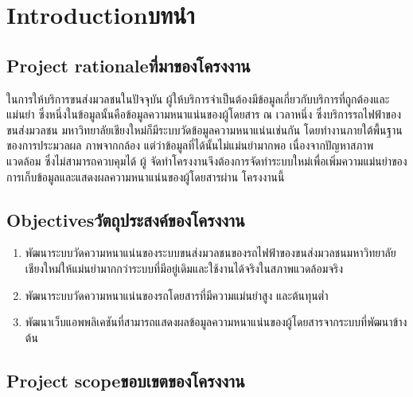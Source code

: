 \chapter{\ifenglish Introduction\else บทนำ\fi}

\section{\ifenglish Project rationale\else ที่มาของโครงงาน\fi}

ในการให้บริการขนส่งมวลชนในปัจจุบัน ผู้ให้บริการจําเป็นต้องมีข้อมูลเกี่ยวกับบริการที่ถูกต้องและแม่นยํา
ซึ่งหนึ่งในข้อมูลนั้นคือข้อมูลความหนาแน่นของผู้โดยสาร ณ เวลาหนึ่ง ซึ่งบริการรถไฟฟ้าของขนส่งมวลชน
มหาวิทยาลัยเชียงใหม่ก็มีระบบวัดข้อมูลความหนาแน่นเช่นกัน โดยทํางานภายใต้พื้นฐานของการประมวลผล
ภาพจากกล้อง แต่ว่าข้อมูลที่ได้นั้นไม่แม่นยํามากพอ เนื่องจากปัญหาสภาพแวดล้อม ซึ่งไม่สามารถควบคุมได้ ผู้
จัดทําโครงงานจึงต้องการจัดทําระบบใหม่เพื่อเพิ่มความแม่นยําของการเก็บข้อมูลและแสดงผลความหนาแน่นของผู้โดยสารผ่าน
โครงงานนี้

\section{\ifenglish Objectives\else วัตถุประสงค์ของโครงงาน\fi}
\begin{enumerate}
    \item พัฒนาระบบวัดความหนาแน่นของระบบขนส่งมวลชนของรถไฟฟ้าของขนส่งมวลชนมหาวิทยาลัย
    เชียงใหม่ให้แม่นยํามากกว่าระบบที่มีอยู่เดิมและใช้งานได้จริงในสภาพแวดล้อมจริง
    \item พัฒนาระบบวัดความหนาแน่นของรถโดยสารที่มีความแม่นยำสูง และต้นทุนต่ำ
    \item พัฒนาเว็บแอพพลิเคชันที่สามารถแสดงผลข้อมูลความหนาแน่นของผู้โดยสารจากระบบที่พัฒนาข้างต้น
\end{enumerate}

\section{\ifenglish Project scope\else ขอบเขตของโครงงาน\fi}

